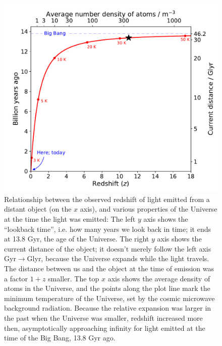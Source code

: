 \documentclass[useAMS]{aa}
\begin{document}
\begin{figure}[!t]
    \begin{center}
        \includegraphics[width=0.98\linewidth]{redshift.pdf}
        \caption{Relationship between the observed redshift of light emitted from a distant object (on the $x$ axis), and various properties of the Universe at the time the light was emitted:
        The left $y$ axis shows the ``lookback time'', i.e. how many years we look back in time; it ends at 13.8 Gyr, the age of the Universe.
        The right $y$ axis shows the current distance of the object; it doesn't merely follow the left axis Gyr$\rightarrow$Glyr, because the Universe expands while the light travels.
        The distance between us and the object at the time of emission was a factor $1+z$ smaller.
        The top $x$ axis shows the average density of atoms in the Universe, and the points along the plot line mark the minimum temperature of the Universe, set by the cosmic microwave background radiation.
        Because the relative expansion was larger in the past when the Universe was smaller, redshift increased more then, asymptotically approaching infinity for light emitted at the time of the Big Bang, 13.8 Gyr ago.}
        \label{fig:redshift}
    \end{center}
\end{figure}
\end{document}
